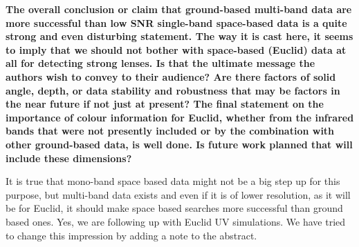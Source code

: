 \documentclass[11pt,a4paper]{article}
\begin{document}
{\bf
The overall conclusion or claim that ground-based multi-band data are more successful than low SNR single-band space-based data is a quite strong and even disturbing statement.  The way it is cast here, it seems to imply that we should not bother with space-based (Euclid) data at all for detecting strong lenses.  Is that the ultimate message the authors wish to convey to their audience?  Are there factors of solid angle, depth, or data stability and robustness that may be factors in the near future if not just at present?  The final statement on the importance of colour information for Euclid, whether from the infrared bands that were not presently included or by the combination with other ground-based data, is well done. Is future work planned that will include these dimensions? 
}

It is true that mono-band space based data might not be a big step up for this purpose, but 
multi-band data exists and even if it is of lower resolution, as it will be for Euclid, it should 
make space based searches more successful than ground based ones.  Yes, we are following 
up with Euclid UV simulations.  We have tried to change this impression by adding a note to the abstract.
\end{document}
